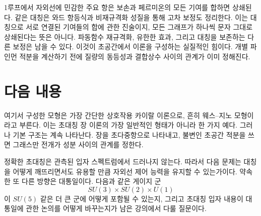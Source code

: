 1루프에서 자외선에 민감한 주요 항은 보손과 페르미온의 모든 기여를 합하면 상쇄된다. 같은 대칭은 와드 항등식과 비재규격화 성질을 통해 고차 보정도 정리한다. 이는 대칭으로 서로 연결된 기여들의 합에 관한 진술이지, 모든 그래프가 하나씩 문자 그대로 상쇄된다는 뜻은 아니다. 파동함수 재규격화, 유한한 효과, 그리고 대칭을 보존하는 다른 보정은 남을 수 있다. 이것이 초공간에서 이론을 구성하는 실질적인 힘이다. 개별 파인먼 적분을 계산하기 전에 질량의 동등성과 결합상수 사이의 관계가 이미 정해진다.

\section{다음 내용}

여기서 구성한 모형은 가장 간단한 상호작용 카이랄 이론으로, 흔히 웨스--지노 모형이라고 부른다. 이는 초대칭 장 이론의 가장 일반적인 형태가 아니라 한 가지 예다. 그러나 기본 구조는 계속 나타난다. 장을 초다중항으로 나타내고, 불변인 초공간 적분을 쓰면 그래스만 전개가 성분 사이의 관계를 정한다.

정확한 초대칭은 관측된 입자 스펙트럼에서 드러나지 않는다. 따라서 다음 문제는 대칭을 어떻게 깨뜨리면서도 유용할 만큼 자외선 제어 능력을 유지할 수 있는가이다. 약속한 또 다른 방향은 대통일이다. 다음과 같은 게이지 군
\begin{equation}
SU(3)\times SU(2)\times U(1)
\end{equation}
이 \(SU(5)\) 같은 더 큰 군에 어떻게 포함될 수 있는지, 그리고 초대칭 입자 내용이 대통일에 관한 논의를 어떻게 바꾸는지가 남은 강의에서 다룰 질문이다.
